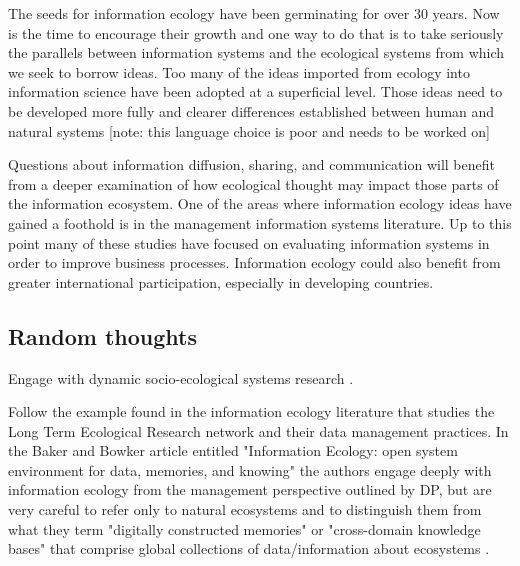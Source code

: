 The seeds for information ecology have been germinating for over 30 years. Now is the time to encourage their growth and one way to do that is to take seriously the parallels between information systems and the ecological systems from which we seek to borrow ideas. Too many of the ideas imported from ecology into information science have been adopted at a superficial level. Those ideas need to be developed more fully and clearer differences established between human and natural systems [note: this language choice is poor and needs to be worked on]

Questions about information diffusion, sharing, and communication will benefit from a deeper examination of how ecological thought may impact those parts of the information ecosystem. One of the areas where information ecology ideas have gained a foothold is in the management information systems literature. Up to this point many of these studies have focused on evaluating information systems in order to improve business processes. Information ecology could also benefit from greater international participation, especially in developing countries. \citep{wang_information_2015}

\subsection{Random thoughts}

Engage with dynamic socio-ecological systems research \citep{liu_etal_2007}.

Follow the example found in the information ecology literature that studies the Long Term Ecological Research network and their data management practices. In the Baker and Bowker article entitled "Information Ecology: open system environment for data, memories, and knowing" the authors engage deeply with information ecology from the management perspective outlined by DP, but are very careful to refer only to natural ecosystems and to distinguish them from what they term "digitally constructed memories" or "cross-domain knowledge bases" that comprise global collections of data/information about ecosystems \citep[][p. 131]{baker_2007}.

